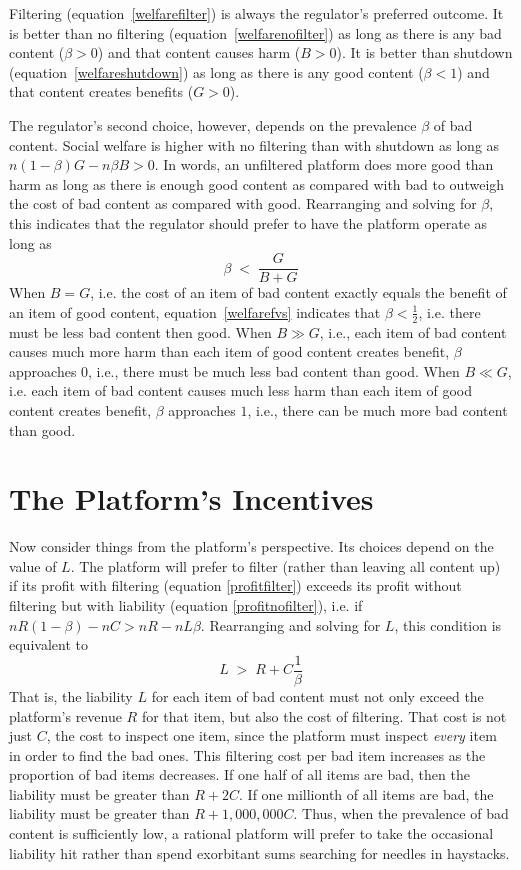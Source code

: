 Filtering (equation~\ref{welfarefilter}) is always the regulator's preferred outcome. It is better than no filtering (equation~\ref{welfarenofilter}) as long as there is any bad content ($\beta > 0$) and that content causes harm ($B > 0$). It is better than shutdown (equation~\ref{welfareshutdown}) as long as there is any good content ($\beta < 1$) and that content creates benefits ($G > 0$).

The regulator's second choice, however, depends on the prevalence $\beta$ of bad content. Social welfare is higher with no filtering than with shutdown as long as $n(1-\beta)G - n \beta B > 0$. In words, an unfiltered platform does more good than harm as long as there is enough good content as compared with bad to outweigh the cost of bad content as compared with good. Rearranging and solving for $\beta$, this indicates that the regulator should prefer to have the platform operate as long as
\begin{equation}
\label{welfarefvs}
\beta \;<\; \frac{G}{B+G}
\end{equation}
When $B=G$, i.e. the cost of an item of bad content exactly equals the benefit of an item of good content, equation~\ref{welfarefvs} indicates that $\beta < \frac{1}{2}$, i.e. there must be less bad content then good. When $B \gg G$, i.e., each item of bad content causes much more harm than each item of good content creates benefit, $\beta$ approaches $0$, i.e., there must be much less bad content than good. When $B \ll G$, i.e. each item of bad content causes much less harm than each item of good content creates benefit, $\beta$ approaches $1$, i.e., there can be much more bad content than good.

\section{The Platform's Incentives}

Now consider things from the platform's perspective.  Its choices depend on the value of $L$. The platform will prefer to filter (rather than leaving all content up) if its profit with filtering (equation \ref{profitfilter}) exceeds its profit without filtering but with liability (equation \ref{profitnofilter}), i.e. if $nR(1 - \beta) - nC >  nR - nL\beta$. Rearranging and solving for $L$,  this condition is equivalent to 
\begin{equation}
\label{dofilter}
L \;>\; R + C\frac{1}{\beta}
\end{equation}
That is, the liability $L$ for each item of bad content must not only exceed the platform's revenue $R$ for that item, but also the cost of filtering. That cost is not just $C$, the cost to inspect one item, since the platform must inspect \emph{every} item in order to find the bad ones. This filtering cost per bad item increases as the proportion of bad items decreases. If one half of all items are bad, then the  liability must be greater than $R + 2C$. If one millionth of all items are bad, the liability must be greater than $R + 1,000,000C$. Thus, when the prevalence of bad content is sufficiently low, a rational platform  will prefer to take the occasional liability hit rather than spend exorbitant sums searching for needles in haystacks.  

